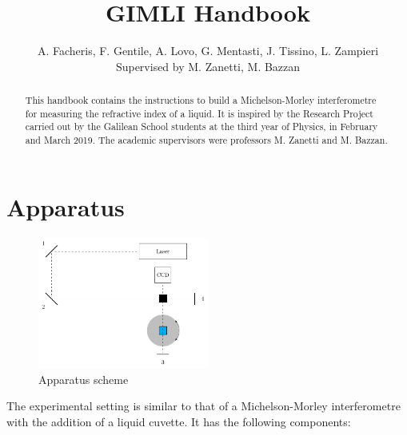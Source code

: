 \documentclass[a4paper, 12pt]{article}
\title{GIMLI Handbook}
\author{A. Facheris, F. Gentile, A. Lovo, G. Mentasti, J. Tissino, L. Zampieri\\Supervised by M. Zanetti, M. Bazzan}
\begin{document}
\maketitle

\begin{abstract}
This handbook contains the instructions to build a Michelson-Morley interferometre for measuring the refractive index of a liquid. It is inspired by the Research Project carried out by the Galilean School students at the third year of Physics, in February and March 2019. The academic supervisors were professors M. Zanetti and M. Bazzan.
\end{abstract}

\section{Apparatus}
\begin{figure}[hbt]
    \centering
    \includegraphics[width=0.5\textwidth]{img/schema.pdf}
    \caption{Apparatus scheme}
    \label{fig:ascheme}
\end{figure}
The experimental setting is similar to that of a Michelson-Morley interferometre with the addition of a liquid cuvette. It has the following components: 
\end{document}
